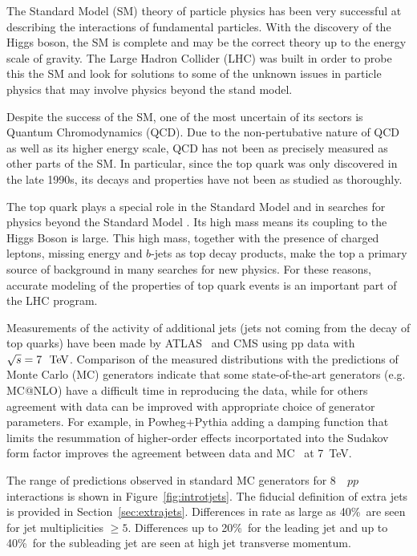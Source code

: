 The Standard Model (SM) theory of particle physics has been very successful at describing the interactions of fundamental particles. With the discovery of the Higgs boson, the SM is complete and may be the correct theory up to the energy scale of gravity. The Large Hadron Collider (LHC) was built in order to probe this the SM and look for solutions to some of the unknown issues in particle physics that may involve physics beyond the stand model.

Despite the success of the SM, one of the most uncertain of its sectors is Quantum Chromodynamics (QCD). Due to the non-pertubative nature of QCD as well as its higher energy scale, QCD has not been as precisely measured as other parts of the SM. In particular, since the top quark was only discovered in the late 1990s, its decays and properties have not been as studied as thoroughly. 

The top quark plays a special role in the Standard Model and in searches for
physics beyond the Standard Model .  Its high mass means its coupling to the
Higgs Boson is large.  This high mass, together with the presence of 
charged leptons, missing energy and $b$-jets as top decay products,
make the top a primary source of background in many searches for new physics.
For these reasons, accurate modeling of the properties of top quark
events is an important part of the LHC program.

Measurements of the activity of additional jets (jets not coming from the decay of top quarks)
have been made by ATLAS~\cite{gapfraction,hdamp,ljets} and CMS\cite{Chatrchyan:2014gma} using
pp data with $\sqrt{s}=7~\TeV$.  Comparison of the measured distributions with the predictions of Monte Carlo (MC) generators
indicate that some state-of-the-art generators (e.g. {\textsc MC@NLO}) have a difficult time in reproducing the data,
while for others  agreement with data can be improved with appropriate
choice of generator parameters.  For example, in {\textsc Powheg+Pythia} adding a damping
function that limits the resummation of higher-order effects incorportated into  the Sudakov form factor improves
the agreement between data and MC~\cite{hdamp} at 7~TeV.  

The range of predictions observed in standard MC generators for
8~\TeV\ $pp$ interactions is shown in 
Figure~\ref{fig:introtjets}. The fiducial definition of extra jets is provided in Section~\ref{sec:extrajets}.  
Differences in rate as large as 40\%\  are seen for
jet multiplicities $\ge 5$.  Differences up to 20\%\ for the leading
jet and up to 40\%\ for the subleading jet are seen at high jet transverse
momentum.  


